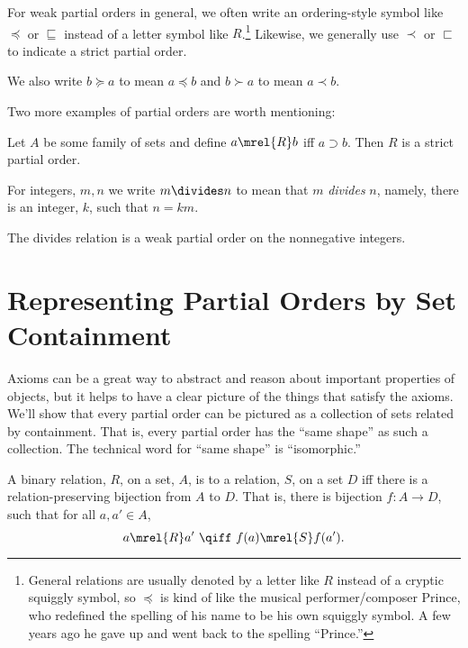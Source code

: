 For weak partial orders in general, we often write an ordering-style
symbol like $\preceq$ or $\sqsubseteq$ instead of a letter symbol like
$R$.\footnote{General relations are usually denoted by a letter like
  $R$ instead of a cryptic squiggly symbol, so $\preceq$ is kind of
  like the musical performer/composer Prince, who redefined the
  spelling of his name to be his own squiggly symbol.  A few years ago
  he gave up and went back to the spelling ``Prince.''}  Likewise, we
generally use $\prec$ or $\sqsubset$ to indicate a strict partial
order.

\begin{staffnotes}

We also write $b \succeq a$ to
mean $a \preceq b$ and $b \succ a$ to mean $a \prec b$.

\end{staffnotes}

Two more examples of partial orders are worth mentioning:

\begin{example}\label{supset}
Let $A$ be some family of sets and define $a \mrel{R} b$ iff $a
\supset b$.  Then $R$ is a strict partial order.
\end{example}

For integers, $m,n$ we write $m \divides n$ to mean that $m$
\emph{divides} $n$, namely, there is an integer, $k$, such that $n=km$.

\begin{example}\label{divides}
The divides relation is a weak partial order on the nonnegative integers.
\end{example}

\section{Representing Partial Orders by Set Containment}

Axioms can be a great way to abstract and reason about important
properties of objects, but it helps to have a clear picture of the things
that satisfy the axioms.  We'll show that every partial order can be
pictured as a collection of sets related by containment.  That is, every
partial order has the ``same shape'' as such a collection.  The technical
word for ``same shape'' is ``isomorphic.''

\begin{definition}\label{relation-isomorphism}
  A binary relation, $R$, on a set, $A$, is
   to a relation, $S$, on a set $D$ iff there is a
  relation-preserving bijection from $A$ to $D$.  That is, there is
  bijection $f:A \to D$, such that for all $a,a' \in A$,
  \[
  a \mrel{R} a'\ \qiff\ f(a) \mrel{S} f(a').
  \]
\end{definition}

